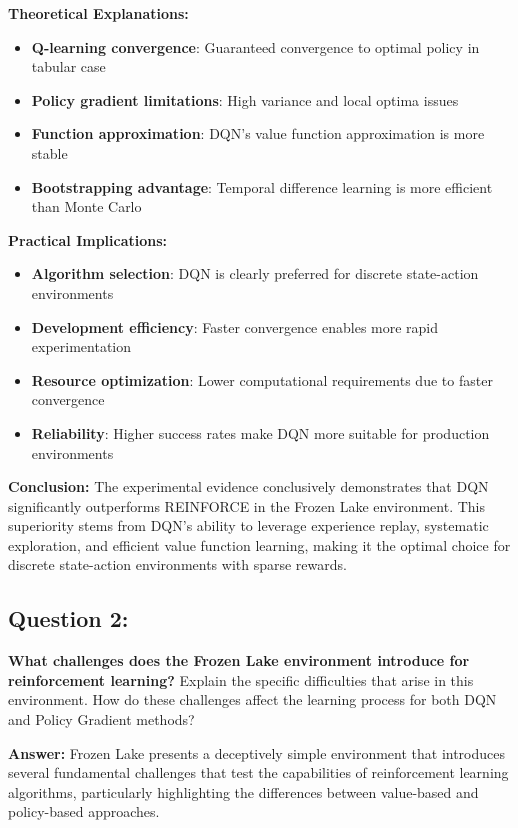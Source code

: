 \documentclass[12pt]{article}
\begin{document}
{{{\textbf{Theoretical Explanations:}
\begin{itemize}
    \item \textbf{Q-learning convergence}: Guaranteed convergence to optimal policy in tabular case
    \item \textbf{Policy gradient limitations}: High variance and local optima issues
    \item \textbf{Function approximation}: DQN's value function approximation is more stable
    \item \textbf{Bootstrapping advantage}: Temporal difference learning is more efficient than Monte Carlo
\end{itemize}

\textbf{Practical Implications:}
\begin{itemize}
    \item \textbf{Algorithm selection}: DQN is clearly preferred for discrete state-action environments
    \item \textbf{Development efficiency}: Faster convergence enables more rapid experimentation
    \item \textbf{Resource optimization}: Lower computational requirements due to faster convergence
    \item \textbf{Reliability}: Higher success rates make DQN more suitable for production environments
\end{itemize}

\textbf{Conclusion:}
The experimental evidence conclusively demonstrates that DQN significantly outperforms REINFORCE in the Frozen Lake environment. This superiority stems from DQN's ability to leverage experience replay, systematic exploration, and efficient value function learning, making it the optimal choice for discrete state-action environments with sparse rewards.

\subsection{Question 2:}
\textbf{ What challenges does the Frozen Lake environment introduce for reinforcement learning?}
\newline
Explain the specific difficulties that arise in this environment. How do these challenges affect the learning process for both DQN and Policy Gradient methods?

\textbf{Answer:} Frozen Lake presents a deceptively simple environment that introduces several fundamental challenges that test the capabilities of reinforcement learning algorithms, particularly highlighting the differences between value-based and policy-based approaches.

}}}
\end{document}
